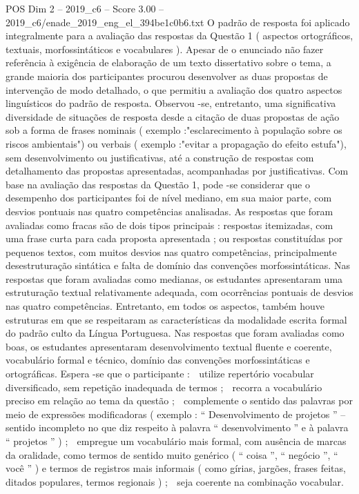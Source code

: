 \begin{textsample}{POS Dim 2 – 2019\_c6 – Score 3.00 – 2019\_c6/enade\_2019\_eng\_el\_394be1c0b6.txt}
O padrão de resposta foi aplicado integralmente para a avaliação das respostas da Questão 1 ( aspectos ortográficos, textuais, morfossintáticos e vocabulares ).
Apesar de o enunciado não fazer referência à exigência de elaboração de um texto dissertativo sobre o tema, a grande maioria dos participantes procurou desenvolver as duas propostas de intervenção de modo detalhado, o que permitiu a avaliação dos quatro aspectos linguísticos do padrão de resposta.
Observou -se, entretanto, uma significativa diversidade de situações de resposta desde a citação de duas propostas de ação sob a forma de frases nominais ( exemplo :"esclarecimento à população sobre os riscos ambientais") ou verbais ( exemplo :"evitar a propagação do efeito estufa"), sem desenvolvimento ou justificativas, até a construção de respostas com detalhamento das propostas apresentadas, acompanhadas por justificativas.
Com base na avaliação das respostas da Questão 1, pode -se considerar que o desempenho dos participantes foi de nível mediano, em sua maior parte, com desvios pontuais nas quatro competências analisadas.
As respostas que foram avaliadas como fracas são de dois tipos principais : respostas itemizadas, com uma frase curta para cada proposta apresentada ; ou respostas constituídas por pequenos textos, com muitos desvios nas quatro competências, principalmente desestruturação sintática e falta de domínio das convenções morfossintáticas.
Nas respostas que foram avaliadas como medianas, os estudantes apresentaram uma estruturação textual relativamente adequada, com ocorrências pontuais de desvios nas quatro competências.
Entretanto, em todos os aspectos, também houve estruturas em que se respeitaram as características da modalidade escrita formal do padrão culto da Língua Portuguesa.
Nas respostas que foram avaliadas como boas, os estudantes apresentaram desenvolvimento textual fluente e coerente, vocabulário formal e técnico, domínio das convenções morfossintáticas e ortográficas.
Espera -se que o participante :  utilize repertório vocabular diversificado, sem repetição inadequada de termos ;  recorra a vocabulário preciso em relação ao tema da questão ;  complemente o sentido das palavras por meio de expressões modificadoras ( exemplo : “ Desenvolvimento de projetos ” – sentido incompleto no que diz respeito à palavra “ desenvolvimento ” e à palavra “ projetos ” ) ;  empregue um vocabulário mais formal, com ausência de marcas da oralidade, como termos de sentido muito genérico ( “ coisa ”, “ negócio ”, “ você ” ) e termos de registros mais informais ( como gírias, jargões, frases feitas, ditados populares, termos regionais ) ;  seja coerente na combinação vocabular.

\end{textsample}
